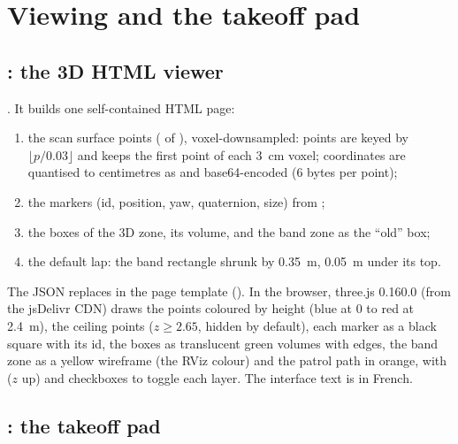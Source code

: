 \section{Viewing and the takeoff pad}
\label{sec:mapping-view-home}

\subsection{\texorpdfstring{}{zone\_view.py}: the 3D HTML viewer}

. It builds one self-contained HTML page:
\begin{enumerate}[nosep]
\item the scan surface points ( of ), voxel-downsampled: points are
  keyed by $\lfloor p / 0.03\rfloor$ and  keeps the first point of each
  3~cm voxel; coordinates are quantised to centimetres as  and base64-encoded (6 bytes per point);
\item the markers (id, position, yaw, quaternion, size) from ;
\item the boxes of the 3D zone, its volume, and the band zone as the ``old'' box;
\item the  default lap: the band rectangle shrunk by 0.35~m, 0.05~m under its top.
\end{enumerate}
The JSON replaces  in the page template (). In the browser, three.js 0.160.0 (from the
jsDelivr CDN) draws the points coloured by height (blue at 0 to red at 2.4~m), the ceiling points
($z \geq 2.65$, hidden by default), each marker as a black square with its id, the boxes as translucent green
volumes with edges, the band zone as a yellow wireframe (the RViz colour) and the patrol path in orange, with
 ($z$ up) and checkboxes to toggle each layer. The interface text is in French.

\subsection{\texorpdfstring{}{set\_home.py}: the takeoff pad}

